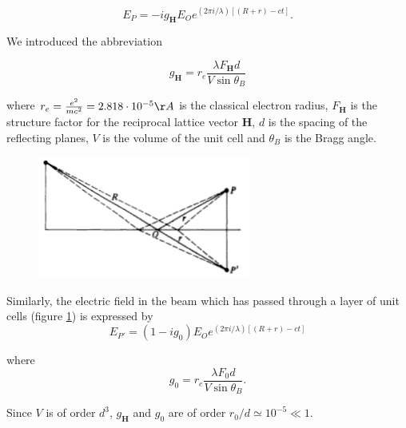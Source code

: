 \documentclass[12pt,oneside,notitlepage,abstracton,a4paper]{scrartcl}
\begin{document}
\begin{equation}
 E_P=-ig_\mathbf{H}E_Oe^{(2\pi i /\lambda)[(R+r)-ct]}.
\end{equation}

We introduced the abbreviation

\begin{equation}\label{eqg}
 g_\mathbf{H}=r_e\frac{\lambda F_\mathbf{H}d}{V \sin{\theta_B}}
\end{equation}

where $r_e=\frac{e^2}{mc^2}=2.818 \cdot 10^{-5} \AA{}$ is the classical electron radius, $F_\mathbf{H}$ is the structure factor for the reciprocal lattice vector $\mathbf{H}$, $d$ is the spacing of the reflecting planes, $V$ is the volume of the unit cell and $\theta_B$ is the Bragg angle.

\begin{figure}[h]
\begin{center}
\includegraphics[width=7cm]{pics/picture2.png}
\caption{}
\label{pic2}
\end{center}
\end{figure}


Similarly, the electric field in the beam which has passed through a layer of unit cells (figure \ref{pic2}) is expressed by
\begin{equation}\label{Et}
 E_{P'}=(1-ig_0)E_Oe^{(2\pi i /\lambda)[(R+r)-ct]}
\end{equation}

where
\begin{equation} \label{eqg0}
 g_0=r_e\frac{\lambda F_0 d}{V \sin{\theta_B}}.
\end{equation}

Since $V$ is of order $d^3$, $g_\mathbf{H}$ and $g_0$ are of order $r_0/d \simeq 10^{-5} \ll 1$.

\newpage
\end{document}
